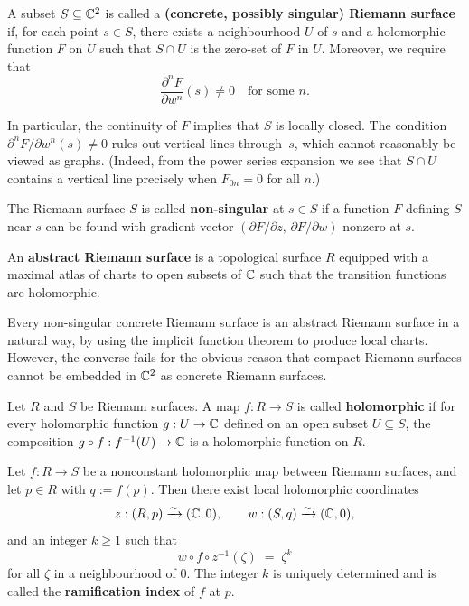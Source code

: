 \documentclass[12pt]{article}
\begin{document}
\begin{definition}
A subset $S\subseteq \mathbb{C}^2$ is called a \textbf{(concrete, possibly singular)
Riemann surface} if, for each point $s\in S$, there exists a neighbourhood
$U$ of $s$ and a holomorphic function $F$ on $U$ such that $S\cap U$ is the
zero-set of $F$ in $U$. Moreover, we require that
\[
  \frac{\partial^n F}{\partial w^n}(s) \neq 0
\quad\text{for some } n.
\]

In particular, the continuity of $F$ implies that $S$ is locally closed.
The condition $\partial^n F/\partial w^n (s)\neq 0$ rules out vertical
lines through~$s$, which cannot reasonably be viewed as graphs.
(Indeed, from the power series expansion we see that $S\cap U$ contains
a vertical line precisely when $F_{0n}=0$ for all $n$.)
\end{definition}

\begin{definition}
The Riemann surface $S$ is called \textbf{non-singular} at $s\in S$ if a
function $F$ defining $S$ near $s$ can be found with gradient vector
$(\partial F/\partial z,\, \partial F/\partial w)$ nonzero at $s$.
\end{definition}

\begin{definition}
    An \textbf{abstract Riemann surface} is a topological surface $R$ equipped with a maximal atlas of charts to open subsets of $\mathbb{C}$ such that the transition functions are holomorphic.
\end{definition}

Every non-singular concrete Riemann surface is an abstract Riemann surface in a natural way, by using the implicit function theorem to produce local charts. However, the converse fails for the obvious reason that compact Riemann surfaces cannot be embedded in $\mathbb{C}^2$ as concrete Riemann surfaces. 

\begin{definition}
    Let $R$ and $S$ be Riemann surfaces. A map $f : R \to S$ is called \textbf{holomorphic} if for every holomorphic function $g : U \to \mathbb{C}$ defined on an open subset $U \subseteq S$, the composition $g \circ f : f^{-1}(U) \to \mathbb{C}$ is a holomorphic function on $R$.
\end{definition}

\begin{theorem}
Let $f : R \to S$ be a nonconstant holomorphic map between Riemann surfaces,
and let $p \in R$ with $q := f(p)$. Then there exist local holomorphic
coordinates
\[
z : (R,p) \xrightarrow{\sim} (\mathbb{C},0),
\qquad
w : (S,q) \xrightarrow{\sim} (\mathbb{C},0),
\]
and an integer $k \ge 1$ such that
\[
w \circ f \circ z^{-1}(\zeta) \;=\; \zeta^k
\]
for all $\zeta$ in a neighbourhood of $0$. The integer $k$ is uniquely
determined and is called the \textbf{ramification index} of $f$ at $p$.
\end{theorem}
\end{document}
